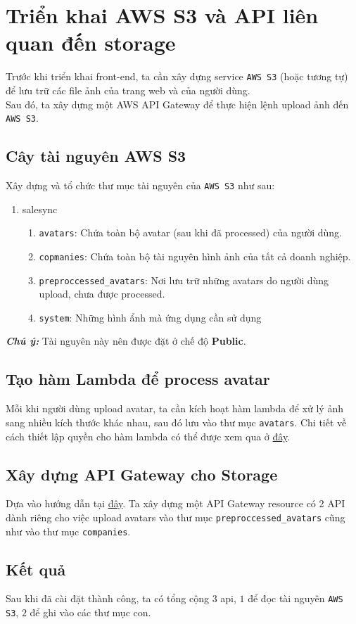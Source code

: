 \chapter{Triển khai AWS S3 và API liên quan đến storage}
\label{Chapter4}
Trước khi triển khai front-end, ta cần xây dựng service \texttt{AWS S3} (hoặc tương tự) để lưu trữ các file ảnh của trang web và của người dùng.\\
Sau đó, ta xây dựng một AWS API Gateway để thực hiện lệnh upload ảnh đến \texttt{AWS S3}.

\section{Cây tài nguyên AWS S3}
Xây dựng và tổ chức thư mục tài nguyên của \texttt{AWS S3} như sau:
\begin{enumerate}
    \item salesync
    \begin{enumerate}
        \item \texttt{avatars}: Chứa toàn bộ avatar (sau khi đã processed) của người dùng.
        \item \texttt{copmanies}: Chứa toàn bộ tài nguyên hình ảnh của tất cả doanh nghiệp.
        \item \texttt{preproccessed\_avatars}: Nơi lưu trữ những avatars do người dùng upload, chưa được processed.
        \item \texttt{system}: Những hình ẩnh mà ứng dụng cần sử dụng            
    \end{enumerate}
\end{enumerate}

\textbf{\textit{Chú ý:}} Tài nguyên này nên được đặt ở chế độ \textbf{Public}.
\section{Tạo hàm Lambda để process avatar}
Mỗi khi người dùng upload avatar, ta cần kích hoạt hàm lambda để xử lý ảnh sang nhiều kích thước khác nhau, sau đó lưu vào thư mục \texttt{avatars}.
Chi tiết về cách thiết lập quyền cho hàm lambda có thể được xem qua ở \href{https://www.geeksforgeeks.org/serverless-image-processing-with-aws-lambda-and-s3/}{đây}.

\section{Xây dựng API Gateway cho Storage}
Dựa vào hướng dẫn tại \href{https://aws.amazon.com/blogs/compute/patterns-for-building-an-api-to-upload-files-to-amazon-s3/}{đây}. Ta xây dựng một API Gateway resource có 2 API dành riêng cho việc upload 
avatars vào thư mục \texttt{preproccessed\_avatars} cũng như vào thư mục \texttt{companies}.

\section{Kết quả}
Sau khi đã cài đặt thành công, ta có tổng cộng $3$ api, $1$ để đọc tài nguyên \texttt{AWS S3}, $2$ để ghi vào các thư mục con.




